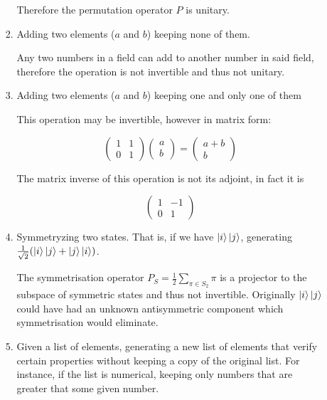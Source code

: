 \documentclass[11pt]{article}
\begin{document}
\begin{enumerate}[label*=\arabic*.]
\begin{enumerate}[label*=\arabic*.]
\begin{enumerate}[label=(\alph*)]
            Therefore the permutation operator $P$ is unitary.
            
            \item Adding two elements ($a$ and $b$) keeping none of them.

            Any two numbers in a field can add to another number in said field, therefore the operation is not invertible and thus not unitary.
            
            \item Adding two elements ($a$ and $b$) keeping one and only one of them

            This operation may be invertible, however in matrix form:

            $$
            \begin{pmatrix}
            1 & 1 \\
            0 & 1
            \end{pmatrix}
            \begin{pmatrix}
                a \\ b
            \end{pmatrix} =
            \begin{pmatrix}
                a+b \\ b
            \end{pmatrix}
            $$

            The matrix inverse of this operation is not its adjoint, in fact it is

            $$
            \begin{pmatrix}
                1 & -1\\
                0 & 1
            \end{pmatrix}
            $$
            
            \item Symmetryzing two states. That is, if we have $\ket{i} \ket{j}$, generating $\frac{1}{\sqrt{2}}(\ket{i}\ket{j}+\ket{j}\ket{i})$.

            The symmetrisation operator $P_S=\frac{1}{2}\sum\limits_{\pi\in S_2}\pi$ is a projector to the subspace of symmetric states and thus not invertible. Originally $\ket{i}\ket{j}$ could have had an unknown antisymmetric component which symmetrisation would eliminate.
            
            \item Given a list of elements, generating a new list of elements that verify certain properties without keeping a copy of the original list. For instance, if the list is numerical, keeping only numbers that are greater that some given number.


\end{enumerate}
\end{enumerate}
\end{enumerate}
\end{document}
